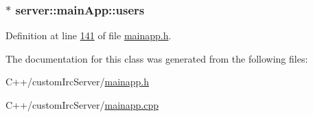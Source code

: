 \hypertarget{classserver_1_1main_app_a0ddcb17051b89af83cd188bf86f6de6e}{
\subsubsection[{users}]{$\ast$ server\-::main\-App\-::users\hspace{0.3cm}{\ttfamily [private]}}}\label{d1/d48/classserver_1_1main_app_a0ddcb17051b89af83cd188bf86f6de6e}


Definition at line \hyperlink{mainapp_8h_source_l00141}{141} of file \hyperlink{mainapp_8h_source}{mainapp.\-h}.



The documentation for this class was generated from the following files\-:\begin{DoxyCompactItemize}
\item 
C++/custom\-Irc\-Server/\hyperlink{mainapp_8h}{mainapp.\-h}\item 
C++/custom\-Irc\-Server/\hyperlink{mainapp_8cpp}{mainapp.\-cpp}\end{DoxyCompactItemize}
